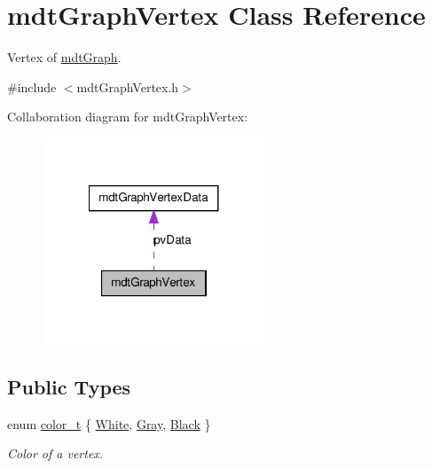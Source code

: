 \hypertarget{classmdt_graph_vertex}{
\section{mdtGraphVertex Class Reference}
\label{classmdt_graph_vertex}
}


Vertex of \hyperlink{classmdt_graph}{mdtGraph}.  




{\ttfamily \#include $<$mdtGraphVertex.h$>$}



Collaboration diagram for mdtGraphVertex:
\nopagebreak
\begin{figure}[H]
\begin{center}
\leavevmode
\includegraphics[width=188pt]{classmdt_graph_vertex__coll__graph}
\end{center}
\end{figure}
\subsection*{Public Types}
\begin{DoxyCompactItemize}
\item 
enum \hyperlink{classmdt_graph_vertex_ae658709c9b5a918bf614bfbf79ac49a5}{color\_\-t} \{ \hyperlink{classmdt_graph_vertex_ae658709c9b5a918bf614bfbf79ac49a5adb79d280cadf0fbcf7f8b3c032294e26}{White}, 
\hyperlink{classmdt_graph_vertex_ae658709c9b5a918bf614bfbf79ac49a5a8e0204f5dac7a1b7b6b299673ed39ef6}{Gray}, 
\hyperlink{classmdt_graph_vertex_ae658709c9b5a918bf614bfbf79ac49a5ade319c74cc7baa5229e487a93cacca30}{Black}
 \}
\begin{DoxyCompactList}\small\item\em Color of a vertex. \end{DoxyCompactList}\end{DoxyCompactItemize}

